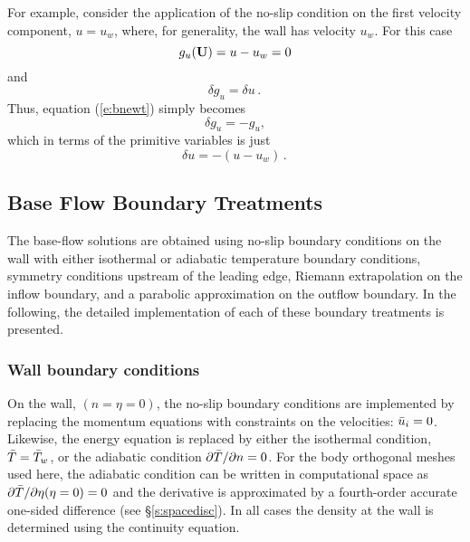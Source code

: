 For example, consider the application of the no-slip condition on the first
velocity component, $u = u_w$, where, for generality, the wall has velocity
$u_w$.  For this case
%
\begin{equation}
  g_u({\bf U}) = u - u_w = 0
\end{equation}
%
and
%
\begin{equation}
  \delta g_u = \delta u \period
\end{equation}
%
Thus, equation (\ref{e:bnewt}) simply becomes
%
\begin{equation}
  \delta g_u = -g_u \comma
\end{equation}
%
which in terms of the primitive variables is just
%
\begin{equation}
  \delta u = -(u - u_w) \period
\end{equation}

\subsection{Base Flow Boundary Treatments \label{ss:meanbc}}

The base-flow solutions are obtained using no-slip boundary conditions on the
wall with either isothermal or adiabatic temperature boundary conditions,
symmetry conditions upstream of the leading edge, Riemann extrapolation on the
inflow boundary, and a parabolic approximation on the outflow boundary.  In
the following, the detailed implementation of each of these boundary
treatments is presented.

\subsubsection{Wall boundary conditions \label{sss:wallbc}}

On the wall, $(n=\eta=0)$, the no-slip boundary conditions are implemented by
replacing the momentum equations with constraints on the velocities: $\bar u_i =
0$. Likewise, the energy equation is replaced by either the isothermal
condition, $\bar T = \bar T_w$, or the adiabatic condition ${\partial \bar T}/{\partial
n} = 0$.  For the body orthogonal meshes used here, the adiabatic condition
can be written in computational space as ${\partial \bar T}/{\partial
\eta}(\eta=0) = 0$ and the derivative is approximated by a fourth-order
accurate one-sided difference (see \S\ref{s:spacedisc}).  In all cases the
density at the wall is determined using the continuity equation.

